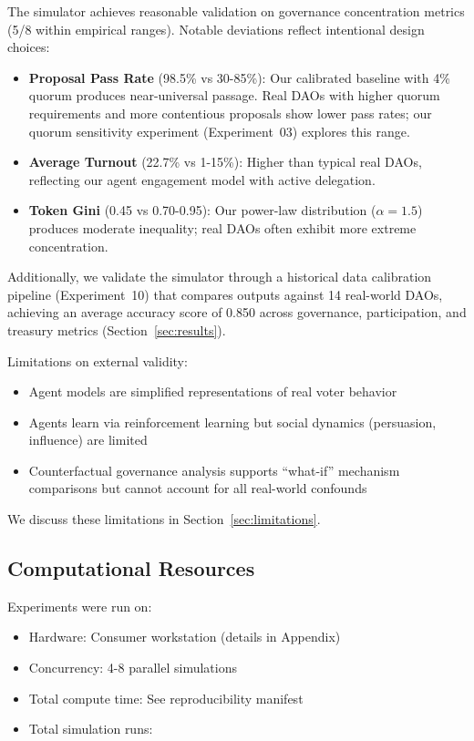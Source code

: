 The simulator achieves reasonable validation on governance concentration metrics (5/8 within empirical ranges). Notable deviations reflect intentional design choices:
\begin{itemize}
    \item \textbf{Proposal Pass Rate} (98.5\% vs 30-85\%): Our calibrated baseline with 4\% quorum produces near-universal passage. Real DAOs with higher quorum requirements and more contentious proposals show lower pass rates; our quorum sensitivity experiment (Experiment~03) explores this range.
    \item \textbf{Average Turnout} (22.7\% vs 1-15\%): Higher than typical real DAOs, reflecting our agent engagement model with active delegation.
    \item \textbf{Token Gini} (0.45 vs 0.70-0.95): Our power-law distribution ($\alpha=1.5$) produces moderate inequality; real DAOs often exhibit more extreme concentration.
\end{itemize}

Additionally, we validate the simulator through a historical data calibration pipeline (Experiment~10) that compares outputs against 14 real-world DAOs, achieving an average accuracy score of 0.850 across governance, participation, and treasury metrics (Section~\ref{sec:results}).

Limitations on external validity:
\begin{itemize}
    \item Agent models are simplified representations of real voter behavior
    \item Agents learn via reinforcement learning but social dynamics (persuasion, influence) are limited
    \item Counterfactual governance analysis supports ``what-if'' mechanism comparisons but cannot account for all real-world confounds
\end{itemize}

We discuss these limitations in Section~\ref{sec:limitations}.

\subsection{Computational Resources}

Experiments were run on:
\begin{itemize}
    \item Hardware: Consumer workstation (details in Appendix)
    \item Concurrency: 4-8 parallel simulations
    \item Total compute time: See reproducibility manifest
    \item Total simulation runs: \totalruns{}
\end{itemize}
